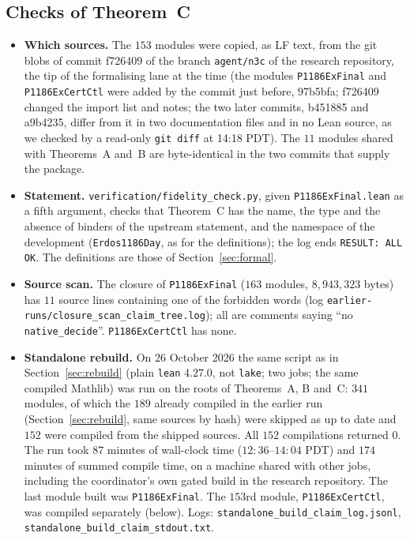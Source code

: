 \documentclass[11pt]{amsart}
\theoremstyle{remark}
\newcommand{\lean}[1]{\texttt{#1}}
\begin{document}
\subsection{Checks of Theorem~C}\label{sec:claimchecks}
\begin{itemize}
\item \textbf{Which sources.} The $153$ modules were copied, as LF text, from the git blobs of commit f726409 of the branch \texttt{agent/n3c} of the research repository, the tip of the formalising lane at the time (the modules \texttt{P1186ExFinal} and \texttt{P1186ExCertCtl} were added by the commit just before, 97b5bfa; f726409 changed the import list and notes; the two later commits, b451885 and a9b4235, differ from it in two documentation files and in no Lean source, as we checked by a read-only \texttt{git diff} at 14:18 PDT). The $11$ modules shared with Theorems~A and~B are byte-identical in the two commits that supply the package.
\item \textbf{Statement.} \texttt{verification/fidelity\_check.py}, given \texttt{P1186ExFinal.lean} as a fifth argument, checks that Theorem~C has the name, the type and the absence of binders of the upstream statement, and the namespace of the development (\lean{Erdos1186Day}, as for the definitions); the log ends \texttt{RESULT: ALL OK}. The definitions are those of Section~\ref{sec:formal}.
\item \textbf{Source scan.} The closure of \texttt{P1186ExFinal} ($163$ modules, $8{,}943{,}323$ bytes) has $11$ source lines containing one of the forbidden words (log \texttt{earlier-runs/closure\_scan\_claim\_tree.log}); all are comments saying ``no \texttt{native\_decide}''. \texttt{P1186ExCertCtl} has none.
\item \textbf{Standalone rebuild.} On 26 October 2026 the same script as in Section~\ref{sec:rebuild} (plain \texttt{lean} $4.27.0$, not \texttt{lake}; two jobs; the same compiled Mathlib) was run on the roots of Theorems~A, B and~C: $341$ modules, of which the $189$ already compiled in the earlier run (Section~\ref{sec:rebuild}, same sources by hash) were skipped as up to date and $152$ were compiled from the shipped sources. All $152$ compilations returned $0$. The run took $87$ minutes of wall-clock time ($12{:}36$--$14{:}04$ PDT) and $174$ minutes of summed compile time, on a machine shared with other jobs, including the coordinator's own gated build in the research repository. The last module built was \texttt{P1186ExFinal}. The $153$rd module, \texttt{P1186ExCertCtl}, was compiled separately (below). Logs: \texttt{standalone\_build\_claim\_log.jsonl}, \texttt{standalone\_build\_claim\_stdout.txt}.

\end{itemize}
\end{document}
